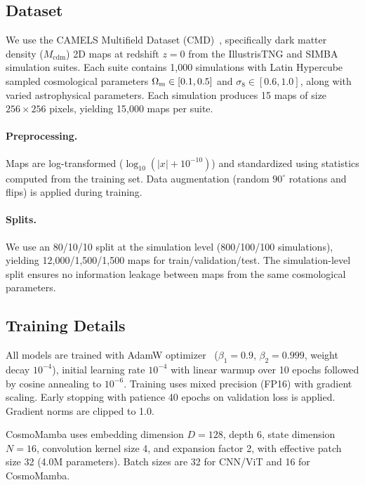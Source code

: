 \documentclass[twocolumn,showpacs,preprintnumbers,amsmath,amssymb,aps,prd]{revtex4-2}
\newcommand{\Om}{\Omega_{\rm m}}
\newcommand{\sig}{\sigma_8}
\begin{document}
\subsection{Dataset}

We use the CAMELS Multifield Dataset (CMD)~\cite{villaescusa2022cmd}, specifically
dark matter density ($M_{\text{cdm}}$) 2D maps at redshift $z = 0$ from the IllustrisTNG
and SIMBA simulation suites. Each suite contains 1,000 simulations with Latin Hypercube
sampled cosmological parameters $\Om \in [0.1, 0.5]$ and $\sig \in [0.6, 1.0]$, along
with varied astrophysical parameters. Each simulation produces 15 maps of size
$256 \times 256$ pixels, yielding 15,000 maps per suite.

\paragraph{Preprocessing.}
Maps are log-transformed ($\log_{10}(|x| + 10^{-10})$) and standardized using
statistics computed from the training set. Data augmentation (random $90^\circ$ rotations
and flips) is applied during training.

\paragraph{Splits.}
We use an 80/10/10 split at the simulation level (800/100/100 simulations), yielding
12,000/1,500/1,500 maps for train/validation/test. The simulation-level split ensures no
information leakage between maps from the same cosmological parameters.

\subsection{Training Details}

All models are trained with AdamW optimizer~\cite{loshchilov2019adamw} ($\beta_1 = 0.9$,
$\beta_2 = 0.999$, weight decay $10^{-4}$), initial learning rate $10^{-4}$ with linear
warmup over 10 epochs followed by cosine annealing to $10^{-6}$. Training uses mixed
precision (FP16) with gradient scaling. Early stopping with patience 40 epochs on
validation loss is applied. Gradient norms are clipped to 1.0.

CosmoMamba uses embedding dimension $D = 128$, depth 6, state dimension $N = 16$,
convolution kernel size 4, and expansion factor 2, with effective patch size 32
(4.0M parameters). Batch sizes are 32 for CNN/ViT and 16 for CosmoMamba.
\end{document}

